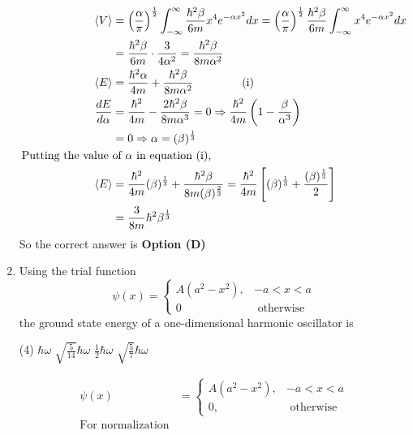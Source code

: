 \begin{enumerate}
\begin{answer}
$$\begin{aligned}
\langle V\rangle&=\left(\frac{\alpha}{\pi}\right)^{\frac{1}{2}} \int_{-\infty}^{\infty} \frac{\hbar^{2} \beta}{6 m} x^{4} e^{-\alpha x^{2}} d x=\left(\frac{\alpha}{\pi}\right)^{\frac{1}{2}} \frac{\hbar^{2} \beta}{6 m} \int_{-\infty}^{\infty} x^{4} e^{-\alpha x^{2}} d x\\&=\frac{\hbar^{2} \beta}{6 m} \cdot \frac{3}{4 \alpha^{2}}=\frac{\hbar^{2} \beta}{8 m \alpha^{2}}\\
\langle E\rangle&=\frac{\hbar^{2} \alpha}{4 m}+\frac{\hbar^{2} \beta}{8 m \alpha^{2}}\hspace{1.5cm}\text{(i)}\\
\frac{d E}{d \alpha}&=\frac{\hbar^{2}}{4 m}-\frac{2 \hbar^{2} \beta}{8 m \alpha^{3}}=0 \Rightarrow \frac{\hbar^{2}}{4 m}\left(1-\frac{\beta}{\alpha^{3}}\right)\\&=0 \Rightarrow \alpha=(\beta)^{\frac{1}{3}}\\
\text{Putting the value }&\text{of $\alpha$ in equation (i),}\\
\langle E\rangle&=\frac{\hbar^{2}}{4 m}(\beta)^{\frac{1}{3}}+\frac{\hbar^{2} \beta}{8 m(\beta)^{\frac{2}{3}}}=\frac{\hbar^{2}}{4 m}\left[(\beta)^{\frac{1}{3}}+\frac{(\beta)^{\frac{1}{3}}}{2}\right]\\&=\frac{3}{8 m} \hbar^{2} \beta^{\frac{1}{3}}
\end{aligned}
$$
So the correct answer is \textbf{Option (D)}
\end{answer}
\item Using the trial function
$$
\psi(x)=\left\{\begin{array}{cc}
A\left(a^{2}-x^{2}\right), & -a<x<a \\
0 & \text { otherwise }
\end{array}\right.
$$
the ground state energy of a one-dimensional harmonic oscillator is
{}
\begin{tasks}(4)
\task[\textbf{A.}] $\hbar \omega$
\task[\textbf{B.}] $\sqrt{\frac{5}{14}} \hbar \omega$
\task[\textbf{C.}] $\frac{1}{2} \hbar \omega$
\task[\textbf{D.}] $\sqrt{\frac{5}{7}} \hbar \omega$
\end{tasks}
\begin{answer}
	$$
\begin{aligned}
\psi(x)&=\left\{\begin{array}{ll}A\left(a^{2}-x^{2}\right), & -a<x<a \\ 0, & \text { otherwise }\end{array}\right.\\
\text{For normalization}\\

\end{aligned}$$
\end{answer}
\end{enumerate}
